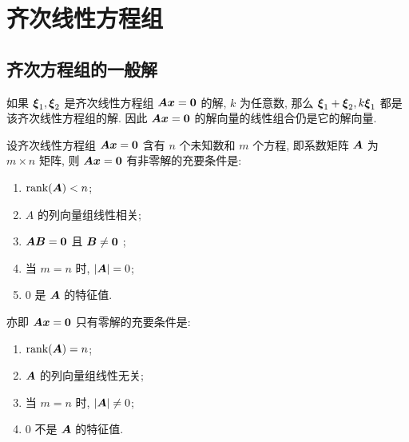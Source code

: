 \section{齐次线性方程组}

\subsection{齐次方程组的一般解}

\begin{theorem}[齐次解的线性组合]
    如果 $ \vb*{\xi}_{1}, \vb*{\xi}_{2} $ 是齐次线性方程组 $ \vb*{Ax}=\vb*{0} $ 的解, $ k $ 为任意数, 那么 $ \vb*{\xi}_{1}+\vb*{\xi}_{2}, k \vb*{\xi}_{1} $ 都是该齐次线性方程组的解. 因此 $ \vb*{A x}=\vb*{0} $ 的解向量的线性组合仍是它的解向量.
\end{theorem}

\begin{theorem}[零解与非零解的充要条件]
    设齐次线性方程组 $ \vb*{Ax}=\vb*{0} $ 含有 $ n $ 个未知数和 $ m $ 个方程, 即系数矩阵 $ \vb*{A} $ 为 $ m \times n$ 矩阵, 则 $ \vb*{A x}=\vb*{0} $ 有非零解的充要条件是:
    \begin{enumerate}[label=(\arabic{*})]
        \item $\rank(\vb*{A})<n $;
        \item $A $ 的列向量组线性相关;
        \item $\vb*{A B}=\vb*{0} $ 且 $ \vb*{B} \neq \vb*{0}$ ;
        \item 当 $ m=n $ 时, $ |\vb*{A}|=0 $;
        \item $0$ 是 $\vb*{A}$ 的特征值.
    \end{enumerate}
    亦即 $ \vb*{A x}=\vb*{0} $ 只有零解的充要条件是:
    \begin{enumerate}[label=(\arabic{*})]
        \item $\rank(\vb*{A})=n$;
        \item $\vb*{A} $ 的列向量组线性无关;
        \item 当 $ m=n $ 时, $ |\vb*{A}| \neq 0 $;
        \item $0$ 不是 $\vb*{A}$ 的特征值.
    \end{enumerate}
\end{theorem}

